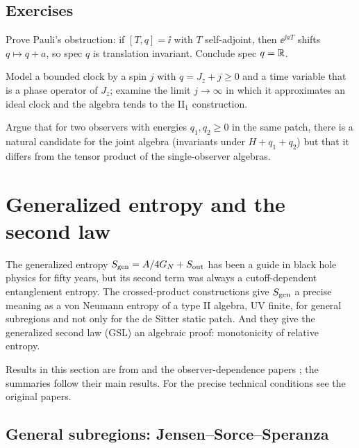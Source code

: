 \subsection*{Exercises}
\begin{exercise}\label{ex:what_observer:1}
Prove Pauli's obstruction: if $[T,q]=\ii$ with $T$ self-adjoint, then $\ee^{\ii aT}$ shifts $q\mapsto q+a$, so spec $q$ is translation invariant. Conclude spec $q=\mathbb{R}$.
\end{exercise}
\begin{exercise}\label{ex:what_observer:2}
Model a bounded clock by a spin $j$ with $q=J_z+j\ge0$ and a time variable that is a phase operator of $J_z$; examine the limit $j\to\infty$ in which it approximates an ideal clock and the algebra tends to the II$_1$ construction.
\end{exercise}
\begin{exercise}\label{ex:what_observer:3}
Argue that for two observers with energies $q_1,q_2\ge0$ in the same patch, there is a natural candidate for the joint algebra (invariants under $H+q_1+q_2$) but that it differs from the tensor product of the single-observer algebras.
\end{exercise}

\section{Generalized entropy and the second law}\label{ch:gen_entropy}

\begin{physmotiv}
The generalized entropy $S_{\mathrm{gen}}=A/4G_N+S_{\rm out}$ has been a guide in black hole physics for fifty years, but its second term was always a cutoff-dependent entanglement entropy. The crossed-product constructions give $S_{\mathrm{gen}}$ a precise meaning as a von Neumann entropy of a type II algebra, UV finite, for general subregions and not only for the de Sitter static patch. And they give the generalized second law (GSL) an algebraic proof: monotonicity of relative entropy.
\end{physmotiv}

\begin{unsettled}
Results in this section are from \cite{JSS2023,FaulknerSperanza2024,Kirklin2024GSL} and the observer-dependence papers \cite{DEHK2024a,DEHK2024b}; the summaries follow their main results. For the precise technical conditions see the original papers.
\end{unsettled}

\subsection{General subregions: Jensen--Sorce--Speranza}

